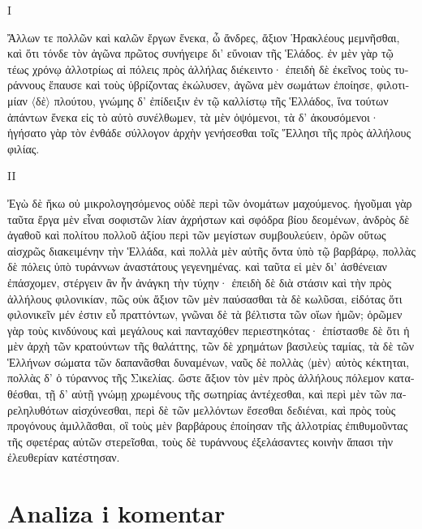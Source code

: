 
\medskip


{\large
{ \noindent I

\begin{greek}

\noindent Ἄλλων τε πολλῶν καὶ καλῶν ἔργων ἕνεκα, ὦ ἄνδρες, ἄξιον Ἡρακλέους μεμνῆσθαι, καὶ ὅτι τόνδε τὸν ἀγῶνα πρῶτος συνήγειρε δι' εὔνοιαν τῆς Ἑλάδος. ἐν μὲν γὰρ τῷ τέως χρόνῳ ἀλλοτρίως αἱ πόλεις πρὸς ἀλλήλας διέκειντο· ἐπειδὴ δὲ ἐκεῖνος τοὺς τυράννους ἔπαυσε καὶ τοὺς ὑβρίζοντας ἐκώλυσεν, ἀγῶνα μὲν σωμάτων ἐποίησε, φιλοτιμίαν $\langle$δὲ$\rangle$ πλούτου, γνώμης δ' ἐπίδειξιν ἐν τῷ καλλίστῳ τῆς Ἑλλάδος, ἵνα τούτων ἁπάντων ἕνεκα εἰς τὸ αὐτὸ συνέλθωμεν, τὰ μὲν ὀψόμενοι, τὰ δ' ἀκουσόμενοι· ἡγήσατο γὰρ τὸν ἐνθάδε σύλλογον ἀρχὴν γενήσεσθαι τοῖς  Ἕλλησι τῆς πρὸς ἀλλήλους φιλίας. 

\end{greek}

\noindent II

\begin{greek}

\noindent  Ἐγὼ δὲ ἥκω οὐ μικρολογησόμενος οὐδὲ περὶ τῶν ὀνομάτων μαχούμενος. ἡγοῦμαι γὰρ ταῦτα ἔργα μὲν εἶναι σοφιστῶν λίαν ἀχρήστων καὶ σφόδρα βίου δεομένων, ἀνδρὸς δὲ ἀγαθοῦ καὶ πολίτου πολλοῦ ἀξίου περὶ τῶν μεγίστων συμβουλεύειν, ὁρῶν οὕτως αἰσχρῶς διακειμένην τὴν Ἑλλάδα, καὶ πολλὰ μὲν αὐτῆς ὄντα ὑπὸ τῷ βαρβάρῳ, πολλὰς δὲ πόλεις ὑπὸ τυράννων ἀναστάτους γεγενημένας. καὶ ταῦτα εἰ μὲν δι' ἀσθένειαν ἐπάσχομεν, στέργειν ἂν ἦν ἀνάγκη τὴν τύχην· ἐπειδὴ δὲ διὰ στάσιν καὶ τὴν πρὸς ἀλλήλους φιλονικίαν, πῶς οὐκ ἄξιον τῶν μὲν παύσασθαι τὰ δὲ κωλῦσαι, εἰδότας ὅτι φιλονικεῖν μέν ἐστιν εὖ πραττόντων, γνῶναι δὲ τὰ βέλτιστα τῶν οἵων ἡμῶν; ὁρῶμεν γὰρ τοὺς κινδύνους καὶ μεγάλους καὶ πανταχόθεν περιεστηκότας· ἐπίστασθε δὲ ὅτι ἡ μὲν ἀρχὴ τῶν κρατούντων τῆς θαλάττης, τῶν δὲ χρημάτων βασιλεὺς ταμίας, τὰ δὲ τῶν Ἑλλήνων σώματα τῶν δαπανᾶσθαι δυναμένων, ναῦς δὲ πολλὰς $\langle$μὲν$\rangle$ αὐτὸς κέκτηται, πολλὰς δ' ὁ τύραννος τῆς Σικελίας. ὥστε ἄξιον τὸν μὲν πρὸς ἀλλήλους πόλεμον καταθέσθαι, τῇ δ' αὐτῇ γνώμῃ χρωμένους τῆς σωτηρίας ἀντέχεσθαι, καὶ περὶ μὲν τῶν παρεληλυθότων αἰσχύνεσθαι, περὶ δὲ τῶν μελλόντων ἔσεσθαι δεδιέναι, καὶ πρὸς τοὺς προγόνους ἁμιλλᾶσθαι, οἳ τοὺς μὲν βαρβάρους ἐποίησαν τῆς ἀλλοτρίας ἐπιθυμοῦντας τῆς σφετέρας αὐτῶν στερεῖσθαι, τοὺς δὲ τυράννους ἐξελάσαντες κοινὴν ἅπασι τὴν ἐλευθερίαν κατέστησαν.
\end{greek}

}
}


\section*{Analiza i komentar}

